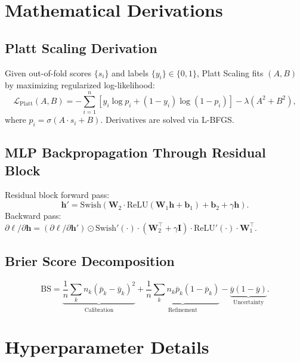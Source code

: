 \documentclass[11pt, a4paper]{article}
\begin{document}
\section{Mathematical Derivations}\label{app:mlp_deriv}

\subsection{Platt Scaling Derivation}

Given out-of-fold scores $\{s_i\}$ and labels $\{y_i\} \in \{0,1\}$, Platt Scaling fits $(A,B)$ by maximizing regularized log-likelihood:
\begin{equation}
\mathcal{L}_{\text{Platt}}(A, B) = -\sum_{i=1}^{n} \left[ y_i \log p_i + (1-y_i)\log(1-p_i) \right] - \lambda(A^2 + B^2),
\end{equation}
where $p_i = \sigma(A \cdot s_i + B)$. Derivatives are solved via L-BFGS.

\subsection{MLP Backpropagation Through Residual Block}

Residual block forward pass:
\begin{equation}
\mathbf{h}' = \text{Swish}\left( \mathbf{W}_2 \cdot \text{ReLU}(\mathbf{W}_1 \mathbf{h} + \mathbf{b}_1) + \mathbf{b}_2 + \gamma \mathbf{h} \right).
\end{equation}
Backward pass: $\partial\ell/\partial\mathbf{h} = (\partial\ell/\partial\mathbf{h}') \odot \text{Swish}'(\cdot) \cdot (\mathbf{W}_2^\top + \gamma\mathbf{I}) \cdot \text{ReLU}'(\cdot) \cdot \mathbf{W}_1^\top$.

\subsection{Brier Score Decomposition}

\begin{equation}
\text{BS} = \underbrace{\frac{1}{n}\sum_k n_k (\bar{p}_k - \bar{y}_k)^2}_{\text{Calibration}}
+ \underbrace{\frac{1}{n}\sum_k n_k \bar{p}_k(1-\bar{p}_k)}_{\text{Refinement}}
- \underbrace{\bar{y}(1-\bar{y})}_{\text{Uncertainty}}.
\end{equation}

\section{Hyperparameter Details}\label{app:hparams}
\end{document}
